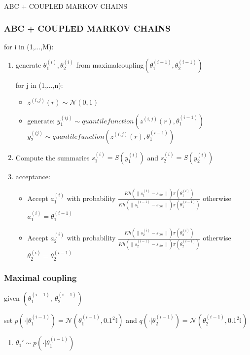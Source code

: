 \documentclass{beamer}
\begin{document}
\begin{section}{ABC + COUPLED MARKOV CHAINS}
\begin{frame}
\end{frame}
\begin{frame}
	\frametitle{ABC + COUPLED MARKOV CHAINS}
	for i in (1,...,M):
	\begin{enumerate}
		\item 	generate $\theta_{1}^{(i)},\theta_{2}^{(i)}$  from maximalcoupling$(\theta_{1}^{(i-1)},\theta_{2}^{(i-1)})$
		
		\begin{block}
			
			for j in (1,...,n):
			\begin{itemize}
				\item $z^{(i,j)}(r) \sim \mathcal{N}(0,1)$
				\item generate:
				$ y_{1}^{(ij)} \sim quantile function(z^{(i,j)}(r), \theta_{1}^{(i-1)})$
				$ y_{2}^{(ij)} \sim quantile function(z^{(i,j)}(r), \theta_{1}^{(i-1)})$
				
			\end{itemize}
		\end{block}
		\item Compute the summaries  $ s_{1}^{(i)} =S(y_{1}^{(i)})$ and $ s_{2}^{(i)} =S(y_{2}^{(i)})$
		
		
		\item acceptance:
		\begin{itemize}
			\item Accept $a_{1}^{(i)}$ with probability $\frac{Kh(\|s_{1}^{(i)}-s_{obs}\|)\pi(\theta_{1}^{(i)})}{Kh(\|s_{1}^{(i-1)}- s_{obs}\|)\pi(\theta_{1}^{(i-1)})} $   otherwise $a_{1}^{(i)}=\theta_{1}^{(i-1)}$
			
			\item Accept $a_{2}^{(i)}$ with probability $\frac{Kh(\|s_{2}^{(i)}-s_{obs}\|)\pi(\theta_{2}^{(i)})}{Kh(\|s_{2}^{(i-1)}-s_{obs}\|)\pi(\theta_{2}^{(i-1)})} $  otherwise $  \theta_{2}^{(i)}=\theta_{2}^{(i-1)}$
		\end{itemize}
	\end{enumerate}
\end{frame}

\begin{frame}
	\frametitle{Maximal coupling}
	given  $(\theta_{1}^{(i-1)}, \ \theta_{2}^{(i-1)})$
	
	set	$p( \cdot |\theta_{1}^{(i-1)})= \mathcal{N}(\theta_{1}^{(i-1)},0.1^2\mathbb{I})$ and $q( \cdot |\theta_{2}^{(i-1)})= \mathcal{N}(\theta_{2}^{(i-1)},0.1^2\mathbb{I})$
	\begin{enumerate}
		\item $ \theta_{1}' \sim p( \cdot |\theta_{1}^{(i-1)} ) $
		

\end{enumerate}
\end{frame}
\end{section}
\end{document}
